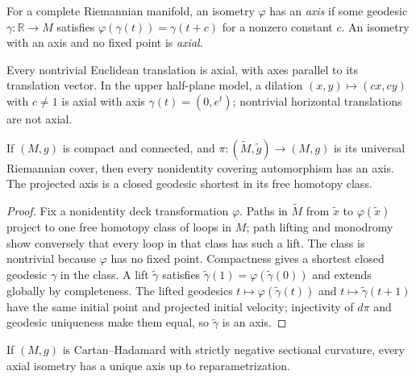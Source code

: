 For a complete Riemannian manifold, an isometry $\varphi$ has an \emph{axis} if
some geodesic $\gamma:\mathbb R\to M$ satisfies
$\varphi(\gamma(t))=\gamma(t+c)$ for a nonzero constant $c$.  An isometry with
an axis and no fixed point is \emph{axial}.

\begin{example}
\label{ex:axial-isometries}
Every nontrivial Euclidean translation is axial, with axes parallel to its
translation vector.  In the upper half-plane model, a dilation
$(x,y)\mapsto(cx,cy)$ with $c\ne1$ is axial with axis
$\gamma(t)=(0,e^t)$; nontrivial horizontal translations are not axial.
\end{example}

\begin{lemma}
\label{lem:covering-automorphism-axis}
If $(M,g)$ is compact and connected, and
$\pi:(\widetilde M,\widetilde g)\to(M,g)$ is its universal Riemannian cover,
then every nonidentity covering automorphism has an axis.  The projected axis
is a closed geodesic shortest in its free homotopy class.
\end{lemma}

\begin{proof}
\sketch
Fix a nonidentity deck transformation $\varphi$.  Paths in $\widetilde M$
from $\widetilde x$ to $\varphi(\widetilde x)$ project to one free homotopy
class of loops in $M$; path lifting and monodromy show conversely that every
loop in that class has such a lift.  The class is nontrivial because $\varphi$
has no fixed point.  Compactness gives a shortest closed geodesic $\gamma$ in
the class.  A lift $\widetilde\gamma$ satisfies
$\widetilde\gamma(1)=\varphi(\widetilde\gamma(0))$ and extends globally by
completeness.  The lifted geodesics
$t\mapsto\varphi(\widetilde\gamma(t))$ and
$t\mapsto\widetilde\gamma(t+1)$ have the same initial point and projected
initial velocity; injectivity of $d\pi$ and geodesic uniqueness make them
equal, so $\widetilde\gamma$ is an axis.
\end{proof}

\begin{lemma}
\label{lem:unique-axis-cartan-hadamard}
If $(M,g)$ is Cartan--Hadamard with strictly negative sectional curvature, every
axial isometry has a unique axis up to reparametrization.
\end{lemma}

